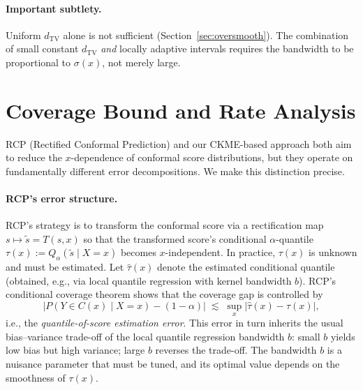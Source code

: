 \documentclass[11pt]{article}
\theoremstyle{remark}
\begin{document}
\paragraph{Important subtlety.}
Uniform $d_{\mathrm{TV}}$ alone is not sufficient (Section~\ref{sec:oversmooth}).
The combination of small constant $d_{\mathrm{TV}}$ \emph{and} locally
adaptive intervals requires the bandwidth to be proportional to
$\sigma(x)$, not merely large.

\section{Coverage Bound and Rate Analysis}
\label{sec:error-comparison}

RCP (Rectified Conformal Prediction) \cite{RCP} and our CKME-based
approach both aim to reduce the $x$-dependence of conformal score
distributions, but they operate on fundamentally different error
decompositions. We make this distinction precise.

\paragraph{RCP's error structure.}
RCP's strategy is to transform the conformal score via a rectification
map $s \mapsto \tilde{s} = T(s, x)$ so that the transformed score's
conditional $\alpha$-quantile $\tau(x) :=
Q_\alpha(\tilde{s} \mid X = x)$ becomes $x$-independent.
In practice, $\tau(x)$ is unknown and must be estimated. Let
$\hat\tau(x)$ denote the estimated conditional quantile (obtained,
e.g., via local quantile regression with kernel bandwidth $b$).
RCP's conditional coverage theorem \cite{RCP} shows that the
coverage gap is controlled by
\begin{equation}
\label{eq:rcp-error}
  \bigl|P(Y \in C(x) \mid X=x) - (1-\alpha)\bigr|
  \;\lesssim\; \sup_x |\hat\tau(x) - \tau(x)|,
\end{equation}
i.e., the \emph{quantile-of-score estimation error}.
This error in turn inherits the usual bias--variance trade-off of
the local quantile regression bandwidth $b$: small $b$ yields low bias
but high variance; large $b$ reverses the trade-off. The bandwidth $b$
is a nuisance parameter that must be tuned, and its optimal value
depends on the smoothness of $\tau(x)$.
\end{document}
